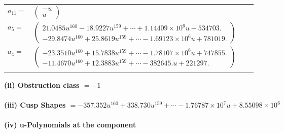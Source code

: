 \documentclass[1p]{elsarticle_modified}
\theoremstyle{definition}
\begin{document}
\begin{tabular}{m{7pt} m{180pt} m{7pt} m{180pt} }
\flushright $a_{11}=$&$\begin{pmatrix}- u\\u\end{pmatrix}$ \\
\flushright $a_{5}=$&$\begin{pmatrix}21.0485 u^{160}-18.9227 u^{159}+\cdots+1.14409\times10^{6} u-534703.\\-29.8474 u^{160}+25.8619 u^{159}+\cdots-1.69123\times10^{6} u+781019.\end{pmatrix}$ \\
\flushright $a_{4}=$&$\begin{pmatrix}-23.3510 u^{160}+15.7838 u^{159}+\cdots-1.78107\times10^{6} u+747855.\\-11.4670 u^{160}+12.3883 u^{159}+\cdots-382645. u+221297.\end{pmatrix}$\\&\end{tabular}
\flushleft \textbf{(ii) Obstruction class $= -1$}\\~\\
\flushleft \textbf{(iii) Cusp Shapes $= -357.352 u^{160}+338.730 u^{159}+\cdots-1.76787\times10^{7} u+8.55098\times10^{6}$}\\~\\
\newpage\renewcommand{\arraystretch}{1}
\flushleft \textbf{(iv) u-Polynomials at the component}\newline \\
\end{document}
